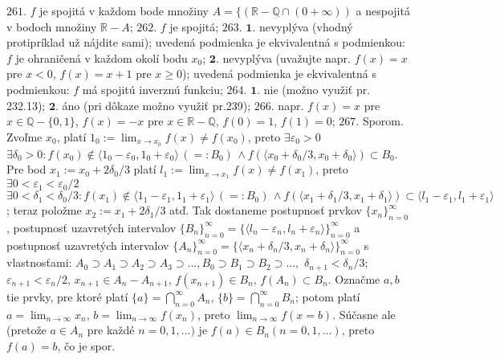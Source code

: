 $\boxed{261.}$ $f$ je spojitá v každom bode množiny $A= \lbrace (\mathbb{R}-\mathbb{Q} \cap (0+\infty))$ a nespojitá v bodoch množiny $\mathbb{R} -A$;
$\boxed{262.}$  $f$ je spojitá;
$\boxed{263.}$ $\boldsymbol{1.}$ nevyplýva (vhodný protipríklad už nájdite sami); uvedená podmienka je ekvivalentná s podmienkou:  $f$ je ohraničená v každom okolí bodu  $x_{0}$;
$\boldsymbol{2.}$ nevyplýva (uvažujte napr. $f(x) = x$ pre $x<0$,   $f(x) = x+1$ pre $x\geq 0$); uvedená podmienka je ekvivalentná s podmienkou:  $f$ má spojitú inverznú funkciu;
$\boxed{264.}$ $\boldsymbol{1.}$ nie (možno využiť pr. 232.13);
$\boldsymbol{2.}$ áno (pri dôkaze možno využiť pr.239);
$\boxed{266.}$ napr. $f(x)=x$ pre $x \in \mathbb{Q}- \lbrace 0,1 \rbrace $, $f(x)=-x$ pre $x \in \mathbb{R}- \mathbb{Q} $, $f(0)=1$, $f(1)=0$;
$\boxed{267.}$ Sporom. Zvoľme $x_{0}$, platí $1_{0}:=\lim_{x \to x_{0} }f(x) \ne f(x_{0})$, preto $\exists \varepsilon_{0} > 0 $  $ \exists\delta_{0 } > 0: f(x_{0}) \notin \langle 1_{0}-\varepsilon_{0}, 1_{0}+\varepsilon_{0} \rangle \, (=:B_{0}) \, \land f(\langle x_{0}+\delta_{0}/3, x_{0}+\delta_{0}\rangle ) \subset B_{0}$. Pre bod $x_{1} :=x_{0}+2\delta_{0}/3$ platí $l_{1}:= \lim_{x \to x_{1} }f(x) \ne f(x_{1}) $, preto $\exists 0< \varepsilon_{1} < \varepsilon_{0}/2 $  $ \exists 0<\delta_{1 } < \delta_{0}/3: f(x_{1}) \notin \langle 1_{1}-\varepsilon_{1}, 1_{1}+\varepsilon_{1} \rangle \, (=:B_{0}) \, \land f(\langle x_{1}+\delta_{1}/3, x_{1}+\delta_{1}\rangle ) \subset \langle l_{1}-\varepsilon_{1},l_{1}+\varepsilon_{1} \rangle$; teraz položme  $x_{2} :=x_{1}+2\delta_{1}/3$ atď. Tak dostaneme postupnosť prvkov $\lbrace x_{n} \rbrace _{n=0}^{\infty}$, postupnosť uzavretých intervalov  $\lbrace B_{n} \rbrace _{n=0}^{\infty} = \lbrace \langle l_{n}-\varepsilon_{n} , l_{n}+\varepsilon_{n}\rangle \rbrace _{n=0}^{\infty}$ a postupnosť uzavretých intervalov  $\lbrace A_{n} \rbrace _{n=0}^{\infty}= \lbrace \langle x_{n}+ \delta_{n}/3, x_{n}+\delta_{n} \rangle \rbrace _{n=0}^{\infty}$ s vlastnosťami: $A_{0}\supset A_{1} \supset  A_{2} \supset A_{3} \supset ..., B_{0}\supset B_{1} \supset B_{2} \supset...,$  $\delta_{n+1}< \delta_{n}/3 $; $\varepsilon_{n+1}< \varepsilon_{n}/2$,  $x_{n+1}\in A_{n}- A_{n+1} $, $f(x_{n+1})\in B_{n} $, $f(A_{n})\subset B_{n} $. Označme $a,b$ tie prvky, pre ktoré platí $\lbrace a\rbrace = \bigcap\limits_{n=0}^\infty A_{n} $, $\lbrace b\rbrace = \bigcap\limits_{n=0}^\infty B_{n} $; potom platí  $ a= \lim_{n \to \infty}x_n , \,  b= \lim_{n \to \infty}f(x_n)$, preto $\lim_{n \to \infty}f(x=b)$. Súčasne ale (pretože $a \in A_{n} $ pre každé $n=0,1,...) $ je $f(a) \in B_{n} (n=0,1,...)$, preto $f(a)=b $, čo je spor.
